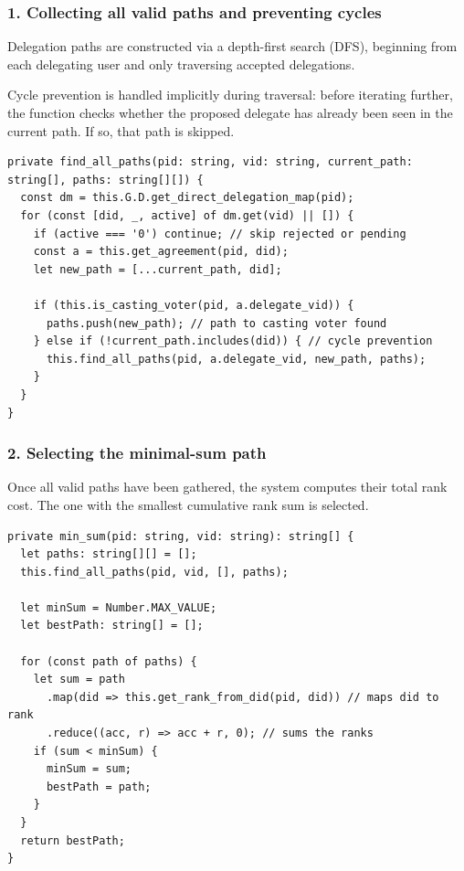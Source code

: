 \subsubsection*{1. Collecting all valid paths and preventing cycles}

Delegation paths are constructed via a depth-first search (DFS), beginning from each delegating user and only traversing accepted delegations.

Cycle prevention is handled implicitly during traversal: before iterating further, the function checks whether the proposed delegate has already been seen in the current path. If so, that path is skipped.

\begin{verbatim}
private find_all_paths(pid: string, vid: string, current_path: string[], paths: string[][]) {
  const dm = this.G.D.get_direct_delegation_map(pid);
  for (const [did, _, active] of dm.get(vid) || []) {
    if (active === '0') continue; // skip rejected or pending
    const a = this.get_agreement(pid, did);
    let new_path = [...current_path, did];

    if (this.is_casting_voter(pid, a.delegate_vid)) {
      paths.push(new_path); // path to casting voter found
    } else if (!current_path.includes(did)) { // cycle prevention
      this.find_all_paths(pid, a.delegate_vid, new_path, paths);
    }
  }
}
\end{verbatim}

\subsubsection*{2. Selecting the minimal-sum path}

Once all valid paths have been gathered, the system computes their total rank cost. The one with the smallest cumulative rank sum is selected.

\begin{verbatim}
private min_sum(pid: string, vid: string): string[] {
  let paths: string[][] = [];
  this.find_all_paths(pid, vid, [], paths);

  let minSum = Number.MAX_VALUE;
  let bestPath: string[] = [];

  for (const path of paths) {
    let sum = path
      .map(did => this.get_rank_from_did(pid, did)) // maps did to rank
      .reduce((acc, r) => acc + r, 0); // sums the ranks
    if (sum < minSum) {
      minSum = sum;
      bestPath = path;
    }
  }
  return bestPath;
}
\end{verbatim}

